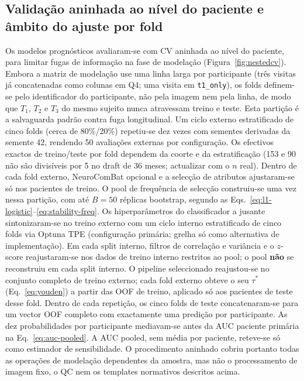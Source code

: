 \documentclass[review]{elsarticle}
\newcommand{\code}[1]{\texttt{#1}}
\begin{document}
\subsection{Validação aninhada ao nível do paciente e âmbito do ajuste por fold}
\label{sec:modelagem}
Os modelos prognósticos avaliaram-se com CV aninhada ao nível do paciente, para limitar fugas de informação na fase de modelação (Figura~\ref{fig:nestedcv}).
Embora a matriz de modelação use uma linha larga por participante (três visitas já concatenadas como colunas em Q4; uma visita em \code{t1\_only}), os folds definem-se pelo identificador do participante, não pela imagem nem pela linha, de modo que $T_1$, $T_2$ e $T_3$ do mesmo sujeito nunca atravessam treino e teste.
Esta partição é a salvaguarda padrão contra fuga longitudinal.
Um ciclo externo estratificado de cinco folds (cerca de 80\%/20\%) repetiu-se dez vezes com sementes derivadas da semente 42, rendendo 50 avaliações externas por configuração.
Os efectivos exactos de treino/teste por fold dependem da coorte e da estratificação (153 e 90 não são divisíveis por 5 no draft de 36 meses; actualizar com o $n$ real).
Dentro de cada fold externo, NeuroComBat opcional e a selecção de atributos ajustaram-se só nos pacientes de treino.
O pool de frequência de selecção construiu-se uma vez nessa partição, com até $B=50$ réplicas bootstrap, segundo as Eqs.~\eqref{eq:l1-logistic}--\eqref{eq:stability-freq}.
Os hiperparâmetros do classificador a jusante sintonizaram-se no treino externo com um ciclo interno estratificado de cinco folds via Optuna TPE (configuração primária; grelha só como alternativa de implementação).
Em cada split interno, filtros de correlação e variância e o $z$-score reajustaram-se nos dados de treino interno restritos ao pool; o pool \textbf{não} se reconstruiu em cada split interno.
O pipeline seleccionado reajustou-se no conjunto completo de treino externo; cada fold externo obteve o seu $\tau^{*}$ (Eq.~\ref{eq:youden}) a partir das OOF de treino, aplicado só aos pacientes de teste desse fold.
Dentro de cada repetição, os cinco folds de teste concatenaram-se para um vector OOF completo com exactamente uma predição por participante.
As dez probabilidades por participante mediavam-se antes da AUC paciente primária na Eq.~\eqref{eq:auc-pooled}.
A AUC pooled, sem média por paciente, reteve-se só como estimador de sensibilidade.
O procedimento aninhado cobriu portanto todas as operações de modelação dependentes da amostra, mas não o processamento de imagem fixo, o QC nem os templates normativos descritos acima.
\end{document}
